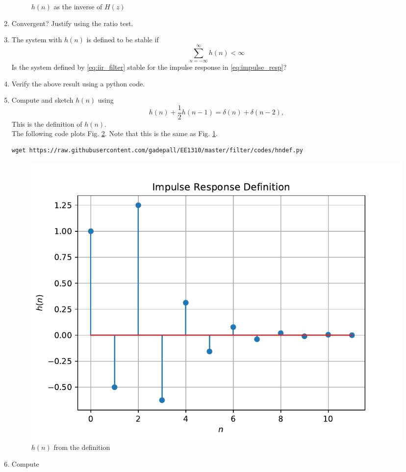 \documentclass[journal,12pt,twocolumn]{IEEEtran}
\renewcommand\thesection{\arabic{section}}
\begin{document}
\begin{enumerate}[label=\thesection.\arabic*]
\begin{figure}[!ht]
\caption{$h(n)$ as the inverse of $H(z)$}
\label{fig:hn}
\end{figure}
%
\item Convergent? Justify using the ratio test.
\item The system with $h(n)$ is defined to be stable if
\begin{equation}
\sum_{n=-\infty}^{\infty}h(n) < \infty
\end{equation}
Is the system defined by \eqref{eq:iir_filter} stable for the impulse response in \eqref{eq:impulse_resp}?
%
\item Verify the above result using a python code.
\item 
Compute and sketch $h(n)$ using 
\begin{equation}
\label{eq:iir_filter_h}
h(n) + \frac{1}{2}h(n-1) = \delta(n) + \delta(n-2), 
\end{equation}
%
This is the definition of $h(n)$.
\\
\solution The following code plots Fig. \ref{fig:hndef}. Note that this is the same as Fig. 
\ref{fig:hn}. 
%
\begin{lstlisting}
wget https://raw.githubusercontent.com/gadepall/EE1310/master/filter/codes/hndef.py
\end{lstlisting}
\begin{figure}[!ht]
\centering
\includegraphics[width=\columnwidth]{./figs/hndef}
\caption{$h(n)$ from the definition}
\label{fig:hndef}
\end{figure}
%
\item Compute 
%
\begin{equation}
\label{eq:convolution}

\end{equation}
\end{enumerate}
\end{document}
